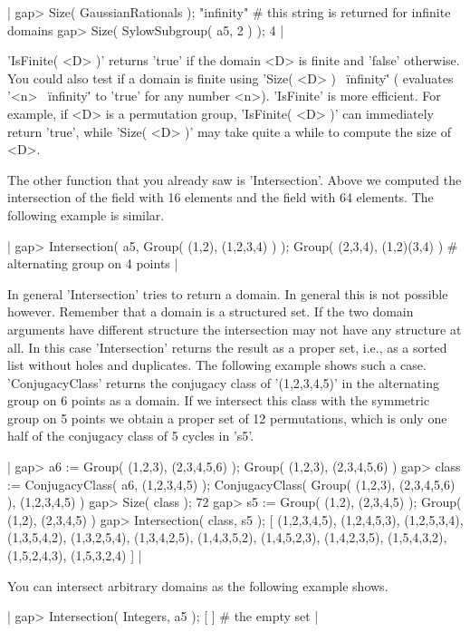 |    gap> Size( GaussianRationals );
    "infinity"    # this string is returned for infinite domains
    gap> Size( SylowSubgroup( a5, 2 ) );
    4 |

'IsFinite( <D> )' returns 'true' if the domain <D> is  finite and 'false'
otherwise.  You could also test if a domain  is finite using 'Size( <D> )
\<\ \"infinity\"' ({\GAP} evaluates '<n> \<\  \"infinity\"' to 'true' for
any number <n>).  'IsFinite' is more efficient.  For example, if <D> is a
permutation group, 'IsFinite( <D> )' can immediately return 'true', while
'Size( <D> )' may take quite a while to compute the size of <D>.

The other function  that you already  saw  is  'Intersection'.  Above  we
computed the intersection  of the field  with  16 elements  and the field
with 64 elements.  The following example is similar.

|    gap> Intersection( a5, Group( (1,2), (1,2,3,4) ) );
    Group( (2,3,4), (1,2)(3,4) )    # alternating group on 4 points |

In general 'Intersection' tries to return a domain.  In  general  this is
not possible  however.  Remember that a  domain is  a structured set.  If
the two domain arguments have different  structure  the  intersection may
not have any  structure at all.   In this case 'Intersection' returns the
result  as a   proper set, i.e.,  as   a sorted list  without holes   and
duplicates.  The following example shows  such a case.   'ConjugacyClass'
returns the conjugacy class of '(1,2,3,4,5)' in  the alternating group on
6 points as  a domain.  If  we  intersect this  class  with the symmetric
group on  5 points we obtain a  proper set of  12 permutations,  which is
only one half of the conjugacy class of 5 cycles in 's5'.

|    gap> a6 := Group( (1,2,3), (2,3,4,5,6) );
    Group( (1,2,3), (2,3,4,5,6) )
    gap> class := ConjugacyClass( a6, (1,2,3,4,5) );
    ConjugacyClass( Group( (1,2,3), (2,3,4,5,6) ), (1,2,3,4,5) )
    gap> Size( class );
    72
    gap> s5 := Group( (1,2), (2,3,4,5) );
    Group( (1,2), (2,3,4,5) )
    gap> Intersection( class, s5 );
    [ (1,2,3,4,5), (1,2,4,5,3), (1,2,5,3,4), (1,3,5,4,2), (1,3,2,5,4),
      (1,3,4,2,5), (1,4,3,5,2), (1,4,5,2,3), (1,4,2,3,5), (1,5,4,3,2),
      (1,5,2,4,3), (1,5,3,2,4) ] |

You can intersect arbitrary domains as the following example shows.

|    gap> Intersection( Integers, a5 );
    [  ]    # the empty set |

